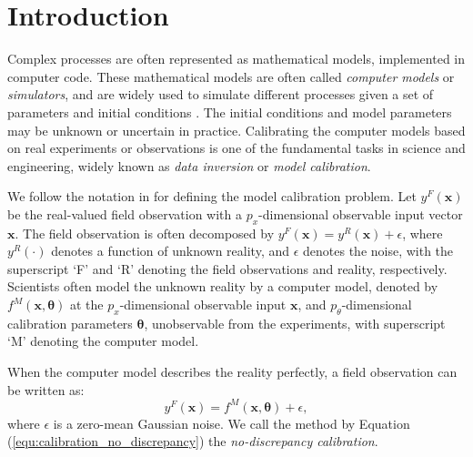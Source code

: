 \section[Introduction]{Introduction}

 Complex processes are often represented as mathematical models, {implemented} in computer code. These mathematical models are  often called \textit{computer models} or \textit{simulators}, {and are widely used to simulate different processes given a set of parameters and initial conditions} \citep{sacks1989design}. The initial conditions and model parameters may be unknown or uncertain in practice. Calibrating the computer models based on real experiments or observations is  one of the fundamental tasks in science and engineering, widely known as  \textit{data inversion} or  \textit{model calibration}. 

We follow the notation in \cite{bayarri2007computer} for defining the model calibration problem. Let $y^F(\mathbf x)$ be the real-valued field observation with a $p_x$-dimensional observable input vector $\mathbf x$. The field observation is often decomposed by $y^F(\mathbf x)=y^R(\mathbf x)+\epsilon$, where $y^R(\cdot)$ denotes a function of unknown reality, and $\epsilon$ denotes the noise, with the superscript `F' and `R' denoting the field observations and reality, respectively.  
 Scientists often model the unknown reality by a computer model, denoted by $ f^M(\mathbf x, \bm \theta)$ at the $p_x$-dimensional observable input $\mathbf  x$, and $p_{\theta}$-dimensional calibration parameters $\bm \theta $, unobservable from the experiments, with superscript `M' denoting the computer model. 
 
 When the computer model describes the reality perfectly, a field observation can be written as:
\begin{equation}
y^F(\mathbf x)= f^M(\mathbf x, \bm \theta)+ \epsilon,
\label{equ:calibration_no_discrepancy}
\end{equation}
where  $\epsilon$ is a zero-mean Gaussian noise.  We call the method by Equation (\ref{equ:calibration_no_discrepancy}) the \textit{no-discrepancy calibration}.

